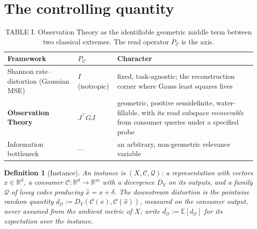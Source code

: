 \documentclass[lettersize,onecolumn]{IEEEtran}
\newtheorem{definition}{Definition}
\theoremstyle{definition}
\theoremstyle{remark}
\newcommand{\PC}{P_{\mathcal{C}}}
\newcommand{\dO}{d_{\mathcal{O}}}
\newcommand{\E}{\mathbb{E}}
\newcommand{\R}{\mathbb{R}}
\begin{document}
\section{The controlling quantity}\label{sec:framework}

\begin{table}[!t]
\centering
\footnotesize
\caption{TABLE I. Observation Theory as the identifiable geometric middle term between two
classical extremes. The read operator $\PC$ is the axis.}
\label{tab:positioning}
\setlength{\tabcolsep}{6pt}\renewcommand{\arraystretch}{1.3}
\begin{tabular}{@{}p{3.0cm}p{2.1cm}p{6.2cm}@{}}
\toprule
\textbf{Framework} & \textbf{$\PC$} & \textbf{Character} \\
\midrule
Shannon rate--distortion (Gaussian MSE) & $I$ (isotropic) & fixed, task-agnostic; the reconstruction corner where Gauss least squares lives \\[2pt]
\textbf{Observation Theory} & $J^\top G J$ & geometric, positive semidefinite, water-fillable, with its read subspace \emph{recoverable} from consumer queries under a specified probe \\[2pt]
Information bottleneck & --- & an arbitrary, non-geometric relevance variable \\
\bottomrule
\end{tabular}
\end{table}

\begin{definition}[Instance]
An instance is $(X,\mathcal{C},\mathcal{Q})$: a representation with vectors
$x\in\R^{d}$, a \emph{consumer} $\mathcal{C}:\R^{d}\to\R^m$ with a divergence $D_Y$
on its outputs, and a family $\mathcal{Q}$ of lossy codes producing $\hat x=x+\delta$.
The downstream distortion is the pointwise random quantity
$\dO:=D_Y(\mathcal{C}(x),\mathcal{C}(\hat x))$, measured on the consumer output, never
assumed from the ambient metric of $X$; write $\bar{\dO}:=\E[\dO]$ for its expectation
over the instance.
\end{definition}
\end{document}
